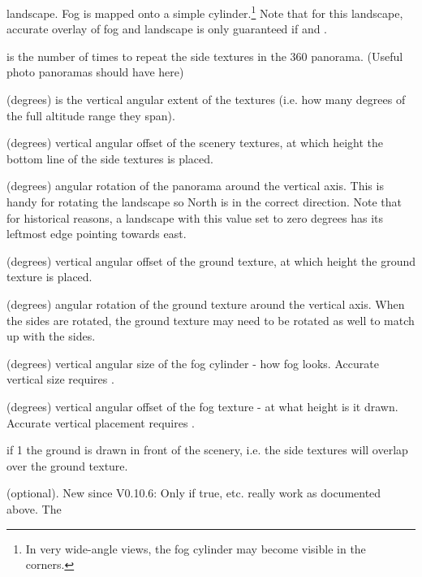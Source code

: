 \begin{description}
  landscape. Fog is mapped onto a simple cylinder.\footnote{In very wide-angle
  views, the fog cylinder may become visible in the corners.} Note that for this
  landscape, accurate overlay of fog and landscape is only guaranteed if
   and . 
\item[\var{nb\_decor\_repeat}] is the number of times to repeat the
  side textures in the 360 panorama. (Useful photo panoramas should
  have  here)
\item[\var{decor\_alt\_angle}] (degrees) is the vertical angular
  extent of the textures (i.e. how many degrees of the full altitude
  range they span).
\item[\var{decor\_angle\_shift}] (degrees) vertical angular offset of
  the scenery textures, at which height the bottom line of the side
  textures is placed.
\item[\var{decor\_angle\_rotatez}] (degrees) angular rotation of the
  panorama around the vertical axis. This is handy for rotating the
  landscape so North is in the correct direction. Note that for
  historical reasons, a landscape with this value set to zero degrees
  has its leftmost edge pointing towards east.
\item[\var{ground\_angle\_shift}] (degrees) vertical angular offset of
  the ground texture, at which height the ground texture is placed.
\item[\var{ground\_angle\_rotatez}] (degrees) angular rotation of the
  ground texture around the vertical axis. When the sides are rotated,
  the ground texture may need to be rotated as well to match up with
  the sides.
\item[\var{fog\_alt\_angle}] (degrees) vertical angular size of the
  fog cylinder - how fog looks. Accurate vertical size requires
  .
\item[\var{fog\_angle\_shift}] (degrees) vertical angular offset of
  the fog texture - at what height is it drawn. Accurate vertical
  placement requires .
\item[\var{draw\_ground\_first}] if 1 the ground is drawn in front of
  the scenery, i.e. the side textures will overlap over the ground
  texture.
\item[\var{calibrated}] (optional). New since V0.10.6: Only if true,
   etc. really work as documented above. The

\end{description}
